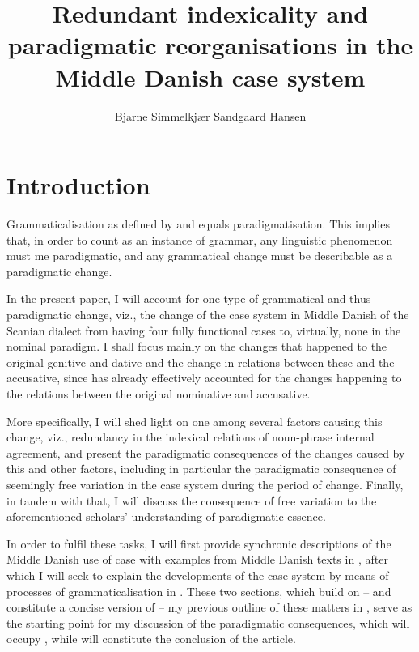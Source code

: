 \documentclass[output=paper]{langsci/langscibook}
\author{Bjarne Simmelkjær Sandgaard Hansen\affiliation{University of Copenhagen}}
\title[Redundant indexicality and paradigmatic reorganisations in Middle Danish]{Redundant indexicality and paradigmatic reorganisations in the Middle Danish case system}
\begin{document}
\maketitle 

\section{Introduction} \label{hansen:1}

Grammaticalisation as defined by \citet[xi, 71–72]{Nørgård-Sørensen2011} and \citet[261--262]{Nørgård-Sørensen2015} equals paradigmatisation. This implies that, in order to count as an instance of grammar, any linguistic phenomenon must me paradigmatic, and any grammatical change must be describable as a paradigmatic change.

In the present paper, I will account for one type of grammatical and thus paradigmatic change, viz., the change of the case system in Middle Danish of the Scanian dialect from having four fully functional cases to, virtually, none in the nominal paradigm. I shall focus mainly on the changes that happened to the original genitive and dative and the change in relations between these and the accusative, since \citet{Jensen2011} has already effectively accounted for the changes happening to the relations between the original nominative and accusative.

More specifically, I will shed light on one among several factors causing this change, viz., redundancy in the indexical relations of noun-phrase internal agreement, and present the paradigmatic consequences of the changes caused by this and other factors, including in particular the paradigmatic consequence of seemingly free variation in the case system during the period of change. Finally, in tandem with that, I will discuss the consequence of free variation to the aforementioned scholars’ understanding of paradigmatic essence.

In order to fulfil these tasks, I will first provide synchronic descriptions of the Middle Danish use of case with examples from Middle Danish texts in , after which I will seek to explain the developments of the case system by means of processes of grammaticalisation in . These two sections, which build on – and constitute a concise version of – my previous outline of these matters in \citet{Hansen2021}, serve as the starting point for my discussion of the paradigmatic consequences, which will occupy , while  will constitute the conclusion of the article.
\end{document}
